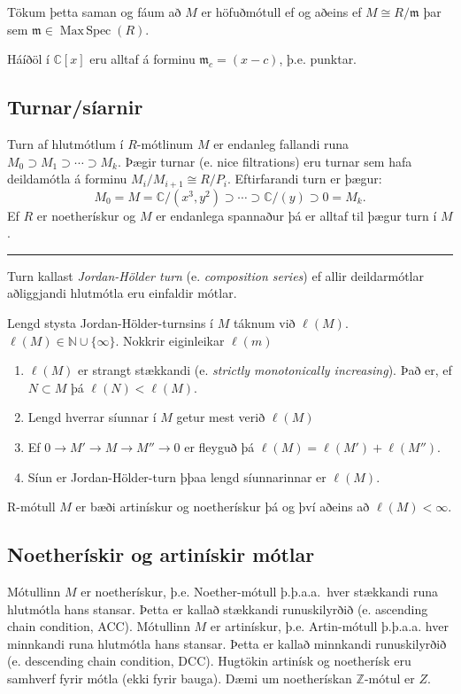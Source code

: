 \documentclass[a4paper, 14pt]{article}
\DeclareMathOperator{\MaxSpec}{Max\, Spec}
\newcommand{\ru}{\noindent\rule{\textwidth}{0.4pt}}
\newcommand{\C}{\mathbb{C}}
\newcommand{\Z}{\mathbb{Z}}
\newcommand{\N}{\mathbb{N}}
\begin{document}
Tökum þetta saman og fáum að $M$ er höfuðmótull ef og aðeins ef $M \cong R/\mathfrak{m}$ þar sem $\mathfrak{m} \in \MaxSpec(R)$.

Háíðöl í $\C[x]$ eru alltaf á forminu $\mathfrak{m}_c = (x-c)$, þ.e. punktar.

\subsection{Turnar/síarnir}
Turn af hlutmótlum í $R$-mótlinum $M$ er endanleg fallandi runa $M_0 \supset M_1 \supset \cdots \supset M_k$. 
Þægir turnar (e. nice filtrations) eru turnar sem hafa deildamótla á forminu $M_i/M_{i+1} \cong R/P_i$. Eftirfarandi turn er þægur:
$$
    M_0 = M = \C / (x^3, y^2) \supset \cdots \supset \C / (y) \supset 0 = M_k.
$$
Ef $R$ er noetherískur og $M$ er endanlega spannaður þá er alltaf til þægur turn í $M$.

\ru

Turn kallast \emph{Jordan-Hölder turn} (e. \emph{composition series}) ef allir deildarmótlar aðliggjandi hlutmótla
eru einfaldir mótlar.

Lengd stysta Jordan-Hölder-turnsins í $M$ táknum við $\ell(M)$. $\ell(M) \in \N \cup \{ \infty \}$.
Nokkrir eiginleikar $\ell(m)$ 
\begin{enumerate}
  \item $\ell(M)$ er strangt stækkandi (e. \emph{strictly monotonically increasing}). Það er,
  ef $N \subset M$ þá  $\ell(N) < \ell(M)$.
  \item Lengd hverrar síunnar í $M$ getur mest verið $\ell(M)$
  \item Ef $0 \to M' \to M \to M'' \to 0$ er fleyguð þá $\ell(M) = \ell(M') + \ell(M'')$.
  \item Síun er Jordan-Hölder-turn þþaa lengd síunnarinnar er $\ell(M)$.
\end{enumerate}
R-mótull $M$ er bæði artinískur og noetherískur þá og því aðeins að $\ell(M) < \infty$.

\subsection{Noetherískir og artinískir mótlar}
Mótullinn $M$ er noetherískur, þ.e. Noether-mótull þ.þ.a.a.\ hver stækkandi runa hlutmótla hans stansar.
Þetta er kallað stækkandi runuskilyrðið (e. ascending chain condition, ACC).
Mótullinn $M$ er artinískur, þ.e. Artin-mótull þ.þ.a.a. hver minnkandi runa hlutmótla hans stansar. 
Þetta er kallað minnkandi runuskilyrðið (e. descending chain condition, DCC).
Hugtökin artinísk og noetherísk eru samhverf fyrir mótla (ekki fyrir bauga).
Dæmi um noetherískan $\Z$-mótul er $Z$. 
\end{document}
